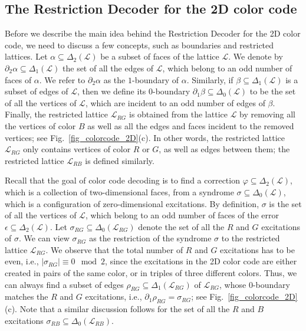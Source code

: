 \documentclass[onecolumn,letterpaper,11pt,accepted=2022-12-19]{quantumarticle}
\newcommand{\face}[2]{{\Delta_{#1}(#2)}}
\renewcommand{\phi}{\varphi}
\theoremstyle{definition}
\theoremstyle{lemma}
\theoremstyle{theorem}
\theoremstyle{corollary}
\begin{document}
\subsection{The Restriction Decoder for the 2D color code}
\label{sec_decoder_2D}


Before we describe the main idea behind the Restriction Decoder for the 2D color code, we need to discuss a few concepts, such as boundaries and restricted lattices.
Let $\alpha\subseteq\face 2 {\mathcal{L}}$ be a subset of faces of the lattice $\mathcal{L}$.
We denote by $\partial_2 \alpha \subseteq \face 1 {\mathcal{L}}$ the set of all the edges of $\mathcal{L}$, which belong to an odd number of faces of $\alpha$.
We refer to $\partial_2 \alpha$ as the $1$-boundary of $\alpha$.
Similarly, if $\beta\subseteq \face 1 {\mathcal{L}}$ is a subset of edges of $\mathcal{L}$, then we define its $0$-boundary $\partial_1 \beta\subseteq \face 0 {\mathcal{L}}$ to be the set of all the vertices of $\mathcal{L}$, which are incident to an odd number of edges of $\beta$.
Finally, the restricted lattice $\mathcal{L}_{RG}$ is obtained from the lattice $\mathcal{L}$ by removing all the vertices of color $B$ as well as all the edges and faces incident to the removed vertices; see Fig.~\ref{fig_colorcode_2D}(c).
In other words, the restricted lattice $\mathcal{L}_{RG}$ only contains vertices of color $R$ or $G$, as well as edges between them; the restricted lattice $\mathcal{L}_{RB}$ is defined similarly.



Recall that the goal of color code decoding is to find a correction $\phi \subseteq \face 2 {\mathcal{L}}$, which is a collection of two-dimensional faces, from a syndrome $\sigma \subseteq \face 0 {\mathcal{L}}$, which is a configuration of zero-dimensional excitations.
By definition, $\sigma$ is the set of all the vertices of $\mathcal{L}$, which belong to an odd number of faces of the error $\epsilon\subseteq\face 2 {\mathcal{L}}$.
Let $\sigma_{RG}\subseteq\face 0 {\mathcal{L}_{RG}}$ denote the set of all the $R$ and $G$ excitations of $\sigma$.
We can view $\sigma_{RG}$ as the restriction of the syndrome $\sigma$ to the restricted lattice $\mathcal{L}_{RG}$.
We observe that the total number of $R$ and $G$ excitations has to be even, i.e., $|\sigma_{RG}| \equiv 0 \mod 2$, since the excitations in the 2D color code are either created in pairs of the same color, or in triples of three different colors.
Thus, we can always find a subset of edges $\rho_{RG}\subseteq \face 1 {\mathcal{L}_{RG}}$ of $\mathcal{L}_{RG}$, whose $0$-boundary matches the $R$ and $G$ excitations, i.e., $\partial_1 \rho_{RG} = \sigma_{RG}$; see Fig.~\ref{fig_colorcode_2D}(c).
Note that a similar discussion follows for the set of all the $R$ and $B$ excitations $\sigma_{RB}\subseteq\face 0 {\mathcal{L}_{RB}}$.
\end{document}
